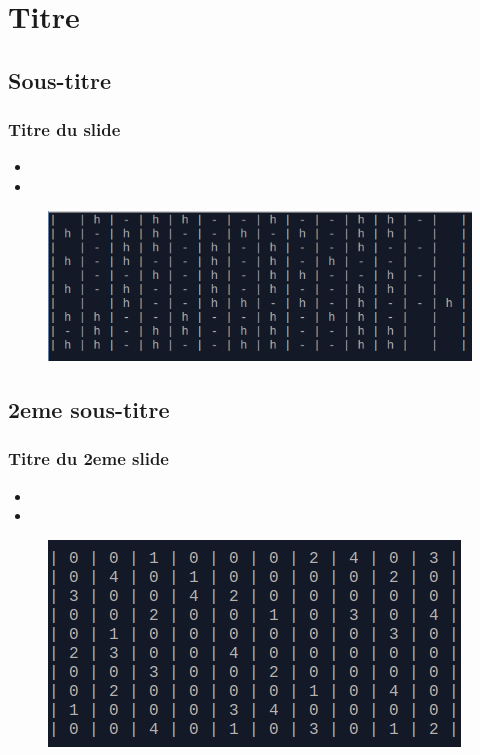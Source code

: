 \section{Titre}

	\subsection{Sous-titre}
		\begin{frame}
		    \frametitle{\textbf{Titre du slide}}
			\begin{itemize}
				 \item 
				 \item 
			\end{itemize}
			\begin{figure}[h]
				\centering
				\includegraphics[scale=0.50]{images/tirette/tirette_horizontale.png}
			\end{figure}
		\end{frame}

\subsection{2eme sous-titre}
	\begin{frame}
		\frametitle{\textbf{Titre du 2eme slide}}
		\begin{itemize}
			\item 
			\item 
		\end{itemize}
		\begin{figure}[h]
			\centering
			\includegraphics[scale=0.45]{images/boule/boule.png}
		\end{figure}
	\end{frame}

